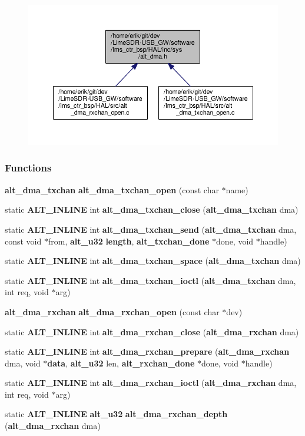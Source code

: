 \begin{figure}[H]
\begin{center}
\leavevmode
\includegraphics[width=350pt]{d6/dc6/alt__dma_8h__dep__incl}
\end{center}
\end{figure}
\subsubsection*{Functions}
\begin{DoxyCompactItemize}
\item 
{\bf alt\+\_\+dma\+\_\+txchan} {\bf alt\+\_\+dma\+\_\+txchan\+\_\+open} (const char $\ast$name)
\item 
static {\bf A\+L\+T\+\_\+\+I\+N\+L\+I\+NE} int {\bf alt\+\_\+dma\+\_\+txchan\+\_\+close} ({\bf alt\+\_\+dma\+\_\+txchan} dma)
\item 
static {\bf A\+L\+T\+\_\+\+I\+N\+L\+I\+NE} int {\bf alt\+\_\+dma\+\_\+txchan\+\_\+send} ({\bf alt\+\_\+dma\+\_\+txchan} dma, const void $\ast$from, {\bf alt\+\_\+u32} {\bf length}, {\bf alt\+\_\+txchan\+\_\+done} $\ast$done, void $\ast$handle)
\item 
static {\bf A\+L\+T\+\_\+\+I\+N\+L\+I\+NE} int {\bf alt\+\_\+dma\+\_\+txchan\+\_\+space} ({\bf alt\+\_\+dma\+\_\+txchan} dma)
\item 
static {\bf A\+L\+T\+\_\+\+I\+N\+L\+I\+NE} int {\bf alt\+\_\+dma\+\_\+txchan\+\_\+ioctl} ({\bf alt\+\_\+dma\+\_\+txchan} dma, int req, void $\ast$arg)
\item 
{\bf alt\+\_\+dma\+\_\+rxchan} {\bf alt\+\_\+dma\+\_\+rxchan\+\_\+open} (const char $\ast$dev)
\item 
static {\bf A\+L\+T\+\_\+\+I\+N\+L\+I\+NE} int {\bf alt\+\_\+dma\+\_\+rxchan\+\_\+close} ({\bf alt\+\_\+dma\+\_\+rxchan} dma)
\item 
static {\bf A\+L\+T\+\_\+\+I\+N\+L\+I\+NE} int {\bf alt\+\_\+dma\+\_\+rxchan\+\_\+prepare} ({\bf alt\+\_\+dma\+\_\+rxchan} dma, void $\ast${\bf data}, {\bf alt\+\_\+u32} len, {\bf alt\+\_\+rxchan\+\_\+done} $\ast$done, void $\ast$handle)
\item 
static {\bf A\+L\+T\+\_\+\+I\+N\+L\+I\+NE} int {\bf alt\+\_\+dma\+\_\+rxchan\+\_\+ioctl} ({\bf alt\+\_\+dma\+\_\+rxchan} dma, int req, void $\ast$arg)
\item 
static {\bf A\+L\+T\+\_\+\+I\+N\+L\+I\+NE} {\bf alt\+\_\+u32} {\bf alt\+\_\+dma\+\_\+rxchan\+\_\+depth} ({\bf alt\+\_\+dma\+\_\+rxchan} dma)
\end{DoxyCompactItemize}


